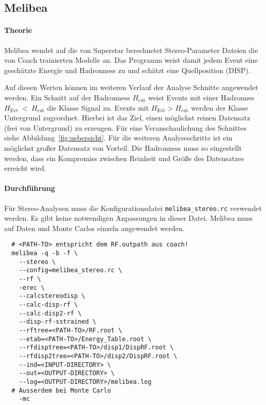 \subsection{Melibea}%
\label{sub:melibea}

\paragraph{Theorie}

Melibea wendet auf die von Superstar berechnetet
Stereo-Parameter Dateien
die von Coach trainierten Modelle an.
Das Programm weist damit jedem Event
eine geschätzte Energie und Hadronness zu
und schätzt eine Quellposition (DISP).

Auf diesen Werten können im weiteren Verlauf der Analyse
Schnitte angewendet werden.
Ein Schnitt auf der Hadronness $H_{\text{cut}}$
weist Events mit einer Hadronnes $H_{\text{Evt}}~<~H_{\text{cut}}$
die Klasse Signal zu.
Events mit $H_{\text{Evt}} > H_{\text{cut}}$ werden der Klasse Untergrund
zugeordnet.
Hierbei ist das Ziel, einen möglichst reinen
Datensatz
(frei von Untergrund)
zu erzeugen.
Für eine Veranschaulichung des Schnittes siehe Abbildung~\ref{fig:uebersicht}.
Für die weiteren Analyseschritte ist ein möglichst
großer Datensatz von Vorteil.
Die Hadronness muss so eingestellt werden,
dass ein Kompromiss zwischen Reinheit und Größe des Datensatzes erreicht wird.


\paragraph{Durchführung}%

Für Stereo-Analysen muss die Konfigurationsdatei \texttt{melibea\_stereo.rc}
verwendet werden.
Es gibt keine notwendigen Anpassungen in dieser Datei.
Melibea muss auf Daten und Monte Carlos einzeln angewendet werden.

\begin{lstlisting}
  # <PATH-TO> entspricht dem RF.outpath aus coach!
  melibea -q -b -f \
    --stereo \
    --config=melibea_stereo.rc \
    --rf \
    -erec \
    --calcstereodisp \
    --calc-disp-rf \
    --calc-disp2-rf \
    --disp-rf-sstrained \
    --rftree=<PATH-TO>/RF.root \
    --etab=<PATH-TO>/Energy_Table.root \
    --rfdisptree=<PATH-TO>/disp1/DispRF.root \
    --rfdisp2tree=<PATH-TO>/disp2/DispRF.root \
    --ind=<INPUT-DIRECTORY> \
    --out=<OUTPUT-DIRECTORY> \
    --log=<OUTPUT-DIRECTORY>/melibea.log
  # Ausserdem bei Monte Carlo
    -mc
\end{lstlisting}
